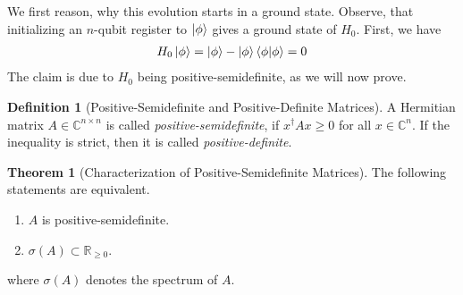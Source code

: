 \documentclass[10pt]{amsart}
\theoremstyle{definition}
\newtheorem{theorem}{Theorem}
\newtheorem{definition}{Definition}
\theoremstyle{remark}
\begin{document}
    We first reason, why this evolution starts in a ground state. Observe, that initializing an \(n\)-qubit register to \(\ket{\phi}\) gives a ground state of \(H_0\). First, we have
    \begin{align}
        H_0\ket{\phi} = \ket{\phi} - \ket{\phi}\braket{\phi} = 0
    \end{align}
    The claim is due to \(H_0\) being positive-semidefinite, as we will now prove.
    \begin{definition}[Positive-Semidefinite and Positive-Definite Matrices]
        A Hermitian matrix \(A \in \mathbb{C}^{n \times n}\) is called \emph{positive-semidefinite}, if \(x^\dagger A x \geq 0\) for all \(x \in \mathbb{C}^n\). If the inequality is strict, then it is called \emph{positive-definite}.
    \end{definition}
    \begin{theorem}[Characterization of Positive-Semidefinite Matrices]
        The following statements are equivalent.
        \begin{enumerate}[label=(\roman*)]
            \item \(A\) is positive-semidefinite.
            \item \(\sigma(A) \subset \mathbb{R}_{\geq 0}\).
        \end{enumerate}
        where \(\sigma(A)\) denotes the spectrum of \(A\).
    \end{theorem}
\end{document}
